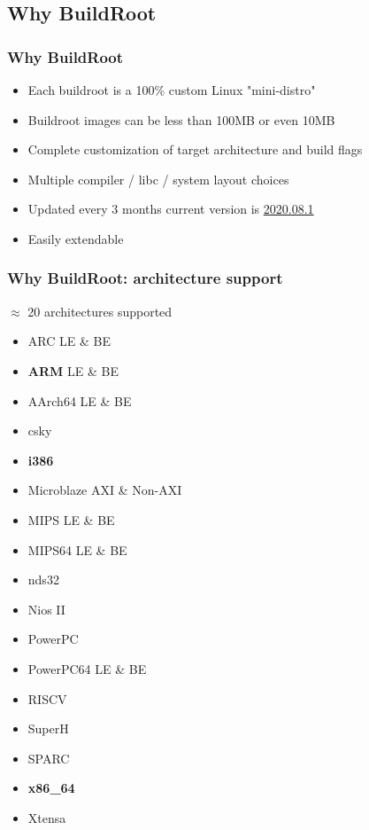 \documentclass{beamer}
\newcommand{\buildrootLatestVersion}{2020.08.1}
\newcommand{\buildrootLatestVersionAnnouncement}{http://lists.busybox.net/pipermail/buildroot/2020-October/294407.html}
\begin{document}
\subsection{Why BuildRoot}
\begin{frame}
  \frametitle{Why BuildRoot}
  \begin{itemize}
    \item Each buildroot is a 100\% custom Linux "mini-distro"
    \item Buildroot images can be less than 100MB or even 10MB
    \item Complete customization of target architecture and build flags
    \item Multiple compiler / libc / system layout choices
    \item Updated every 3 months {\small current version is \href{\buildrootLatestVersionAnnouncement}{\buildrootLatestVersion}}
    \item Easily extendable
  \end{itemize}
\end{frame}
\begin{frame}
  \frametitle{Why BuildRoot: architecture support}
  \begin{center}
    $ \approx $ 20 architectures supported
  \end{center}
  \begin{multicols}{2}
  \begin{itemize}
    \item ARC {\small LE \& BE}
    \item \textbf{ARM} {\small LE \& BE}
    \item AArch64 {\small LE \& BE}
    \item csky
    \item \textbf{i386}
    \item Microblaze {\small AXI \& Non-AXI}
    \item MIPS {\small LE \& BE}
    \item MIPS64 {\small LE \& BE}
    \item nds32
    \item Nios II
    \item PowerPC
    \item PowerPC64 {\small LE \& BE}
    \item RISCV
    \item SuperH
    \item SPARC
    \item \textbf{x86\_64}
    \item Xtensa
  \end{itemize}
  \end{multicols}
\end{frame}
\end{document}
